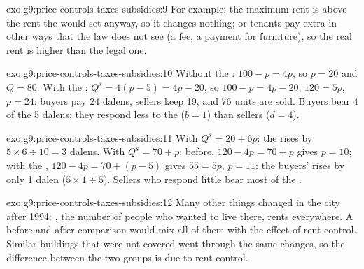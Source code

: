 \begin{solution}{exo:g9:price-controls-taxes-subsidies:9}
For example: the maximum rent is above the rent the  would set anyway, so it changes nothing; or
tenants pay extra in other ways that the law does not see (a fee, a payment for furniture), so the real
rent is higher than the legal one.
\end{solution}

\begin{solution}{exo:g9:price-controls-taxes-subsidies:10}
Without the : $100 - p = 4p$, so $p = 20$ and $Q = 80$. With the : $Q^s = 4(p - 5) = 4p - 20$, so
$100 - p = 4p - 20$, $120 = 5p$, $p = 24$: buyers pay 24 dalens, sellers keep 19, and 76 units are sold.
Buyers bear 4 of the 5 dalens: they respond less to the  ($b = 1$) than sellers ($d = 4$).
\end{solution}

\begin{solution}{exo:g9:price-controls-taxes-subsidies:11}
With $Q^s = 20 + 6p$: the  rises by $5 \times 6 \div 10 = 3$ dalens. With $Q^s = 70 + p$: before,
$120 - 4p = 70 + p$ gives $p = 10$; with the , $120 - 4p = 70 + (p - 5)$ gives $55 = 5p$, $p = 11$: the
buyers'  rises by only 1 dalen ($5 \times 1 \div 5$). Sellers who respond little bear most of the
.
\end{solution}

\begin{solution}{exo:g9:price-controls-taxes-subsidies:12}
Many other things changed in the city after 1994: , the number of people who wanted to live there,
rents everywhere. A before-and-after comparison would mix all of them with the effect of rent control.
Similar buildings that were not covered went through the same changes, so the difference between the two
groups is due to rent control.
\end{solution}

